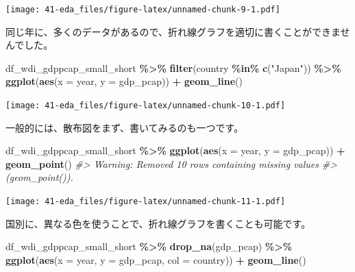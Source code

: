 \documentclass[
  xelatex, ja=standard]{bxjsbook}
\newenvironment{Shaded}{\begin{snugshade}}{\end{snugshade}}
\newcommand{\AttributeTok}[1]{\textcolor[rgb]{0.13,0.29,0.53}{#1}}
\newcommand{\CommentTok}[1]{\textcolor[rgb]{0.56,0.35,0.01}{\textit{#1}}}
\newcommand{\FunctionTok}[1]{\textcolor[rgb]{0.13,0.29,0.53}{\textbf{#1}}}
\newcommand{\NormalTok}[1]{#1}
\newcommand{\SpecialCharTok}[1]{\textcolor[rgb]{0.81,0.36,0.00}{\textbf{#1}}}
\newcommand{\StringTok}[1]{\textcolor[rgb]{0.31,0.60,0.02}{#1}}
\theoremstyle{definition}
\theoremstyle{definition}
\theoremstyle{definition}
\theoremstyle{definition}
\theoremstyle{remark}
\begin{document}
\texttt{[image: 41-eda\_files/figure-latex/unnamed-chunk-9-1.pdf]}

同じ年に、多くのデータがあるので、折れ線グラフを適切に書くことができませんでした。

\begin{Shaded}
\begin{Highlighting}[]
\NormalTok{df\_wdi\_gdppcap\_small\_short }\SpecialCharTok{\%\textgreater{}\%} \FunctionTok{filter}\NormalTok{(country }\SpecialCharTok{\%in\%} \FunctionTok{c}\NormalTok{(}\StringTok{"Japan"}\NormalTok{)) }\SpecialCharTok{\%\textgreater{}\%}
  \FunctionTok{ggplot}\NormalTok{(}\FunctionTok{aes}\NormalTok{(}\AttributeTok{x =}\NormalTok{ year, }\AttributeTok{y =}\NormalTok{ gdp\_pcap)) }\SpecialCharTok{+} \FunctionTok{geom\_line}\NormalTok{()}
\end{Highlighting}
\end{Shaded}

\texttt{[image: 41-eda\_files/figure-latex/unnamed-chunk-10-1.pdf]}

一般的には、散布図をまず、書いてみるのも一つです。

\begin{Shaded}
\begin{Highlighting}[]
\NormalTok{df\_wdi\_gdppcap\_small\_short }\SpecialCharTok{\%\textgreater{}\%}
  \FunctionTok{ggplot}\NormalTok{(}\FunctionTok{aes}\NormalTok{(}\AttributeTok{x =}\NormalTok{ year, }\AttributeTok{y =}\NormalTok{ gdp\_pcap)) }\SpecialCharTok{+} \FunctionTok{geom\_point}\NormalTok{()}
\CommentTok{\#\textgreater{} Warning: Removed 10 rows containing missing values}
\CommentTok{\#\textgreater{} (\textasciigrave{}geom\_point()\textasciigrave{}).}
\end{Highlighting}
\end{Shaded}

\texttt{[image: 41-eda\_files/figure-latex/unnamed-chunk-11-1.pdf]}

国別に、異なる色を使うことで、折れ線グラフを書くことも可能です。

\begin{Shaded}
\begin{Highlighting}[]
\NormalTok{df\_wdi\_gdppcap\_small\_short }\SpecialCharTok{\%\textgreater{}\%} \FunctionTok{drop\_na}\NormalTok{(gdp\_pcap) }\SpecialCharTok{\%\textgreater{}\%}
  \FunctionTok{ggplot}\NormalTok{(}\FunctionTok{aes}\NormalTok{(}\AttributeTok{x =}\NormalTok{ year, }\AttributeTok{y =}\NormalTok{ gdp\_pcap, }\AttributeTok{col =}\NormalTok{ country)) }\SpecialCharTok{+} \FunctionTok{geom\_line}\NormalTok{()}
\end{Highlighting}
\end{Shaded}
\end{document}
